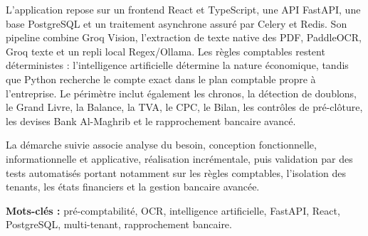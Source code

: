\documentclass[12pt,a4paper,oneside]{report}
\begin{document}
L'application repose sur un frontend React et TypeScript, une API FastAPI, une base PostgreSQL et un traitement asynchrone assuré par Celery et Redis. Son pipeline combine Groq Vision, l'extraction de texte native des PDF, PaddleOCR, Groq texte et un repli local Regex/Ollama. Les règles comptables restent déterministes : l'intelligence artificielle détermine la nature économique, tandis que Python recherche le compte exact dans le plan comptable propre à l'entreprise. Le périmètre inclut également les chronos, la détection de doublons, le Grand Livre, la Balance, la TVA, le CPC, le Bilan, les contrôles de pré-clôture, les devises Bank Al-Maghrib et le rapprochement bancaire avancé.

La démarche suivie associe analyse du besoin, conception fonctionnelle, informationnelle et applicative, réalisation incrémentale, puis validation par des tests automatisés portant notamment sur les règles comptables, l'isolation des tenants, les états financiers et la gestion bancaire avancée.

\textbf{Mots-clés :} pré-comptabilité, OCR, intelligence artificielle, FastAPI, React, PostgreSQL, multi-tenant, rapprochement bancaire.
\end{document}
